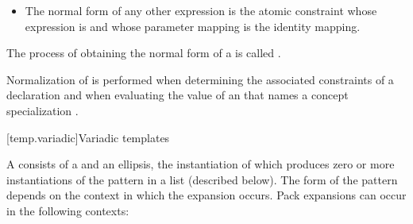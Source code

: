\documentclass{wg21}
\begin{document}
\begin{itemize}


\item
The normal form of any other expression  is
the atomic constraint
whose expression is  and
whose parameter mapping is the identity mapping.
\end{itemize}

\pnum
The process of obtaining the normal form of a
is called
.
\begin{note}
    Normalization of 
    is performed
    when determining the associated constraints 
    of a declaration
    and
    when evaluating the value of an 
    that names a concept specialization .
\end{note}

[temp.variadic]{Variadic templates}

\pnum
{}%
A 
consists of a  and an ellipsis, the instantiation of which
produces zero or more instantiations of the pattern in a list (described below).
The form of the pattern
depends on the context in which the expansion occurs. Pack
expansions can occur in the following contexts:
\end{document}
